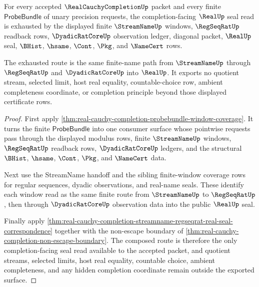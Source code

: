 \begin{theorem}
\label{thm:real-cauchy-completion-finite-window-completion-coverage}
For every accepted $\RealCauchyCompletionUp$ packet and every finite $\mathsf{ProbeBundle}$ of unary precision requests, the completion-facing $\RealUp$ seal read is exhausted by the displayed finite $\StreamNameUp$ windows, $\RegSeqRatUp$ readback rows, $\DyadicRatCoreUp$ observation ledger, diagonal packet, $\RealUp$ seal, $\BHist$, $\hsame$, $\Cont$, $\Pkg$, and $\NameCert$ rows.

The exhausted route is the same finite-name path from $\StreamNameUp$ through $\RegSeqRatUp$ and $\DyadicRatCoreUp$ into $\RealUp$. It exports no quotient stream, selected limit, host real equality, countable-choice row, ambient completeness coordinate, or completion principle beyond those displayed certificate rows.
\end{theorem}
\begin{proof}
First apply \autoref{thm:real-cauchy-completion-probebundle-window-coverage}. It turns the finite $\mathsf{ProbeBundle}$ into one consumer surface whose pointwise requests pass through the displayed modulus rows, finite $\StreamNameUp$ windows, $\RegSeqRatUp$ readback rows, $\DyadicRatCoreUp$ ledgers, and the structural $\BHist$, $\hsame$, $\Cont$, $\Pkg$, and $\NameCert$ data.

Next use the StreamName handoff and the sibling finite-window coverage rows for regular sequences, dyadic observations, and real-name seals. These identify each window read as the same finite route from $\StreamNameUp$ to $\RegSeqRatUp$, then through $\DyadicRatCoreUp$ observation data into the public $\RealUp$ seal.

Finally apply \autoref{thm:real-cauchy-completion-streamname-regseqrat-real-seal-correspondence} together with the non-escape boundary of \autoref{thm:real-cauchy-completion-non-escape-boundary}. The composed route is therefore the only completion-facing seal read available to the accepted packet, and quotient streams, selected limits, host real equality, countable choice, ambient completeness, and any hidden completion coordinate remain outside the exported surface.
\end{proof}

